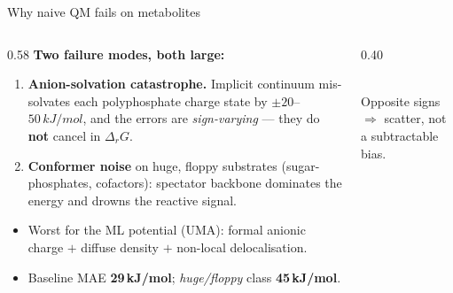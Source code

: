 \documentclass[aspectratio=169,11pt]{beamer}
\newcommand{\kj}{\,kJ/mol}
\begin{document}
\begin{frame}{Why naive QM fails on metabolites}
  \begin{columns}[T]
    \begin{column}{0.58\textwidth}
    \textbf{Two failure modes, both large:}
    \begin{enumerate}
      \item \textbf{Anion-solvation catastrophe.} Implicit continuum mis-solvates each
      polyphosphate charge state by $\pm20$–$50\kj$, and the errors are \emph{sign-varying}
      — they do \textbf{not} cancel in $\Delta_r G$.
      \item \textbf{Conformer noise} on huge, floppy substrates (sugar-phosphates, cofactors):
      spectator backbone dominates the energy and drowns the reactive signal.
    \end{enumerate}
    \vspace{0.4em}
    \begin{itemize}
      \item Worst for the ML potential (UMA): formal anionic charge $+$ diffuse density $+$ non-local delocalisation.
      \item Baseline MAE \textbf{29\kj}; \emph{huge/floppy} class \textbf{45\kj}.
    \end{itemize}
    \end{column}
    \begin{column}{0.40\textwidth}
      \centering
      \\[0.2em]{\scriptsize Opposite signs $\Rightarrow$ scatter, not a subtractable bias.}
    \end{column}
  \end{columns}
\end{frame}
\end{document}
